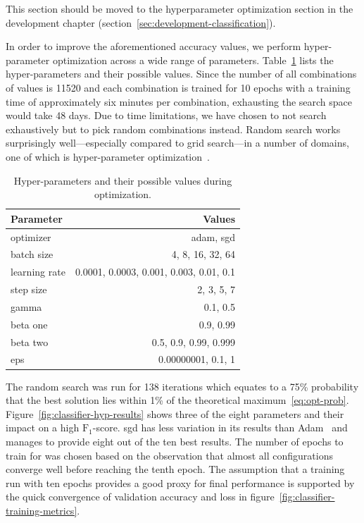 \documentclass[draft,final]{vutinfth} %
\begin{document}
This section should be moved to the hyperparameter optimization
section in the development chapter
(section~\ref{sec:development-classification}).

In order to improve the aforementioned accuracy values, we perform
hyper-parameter optimization across a wide range of
parameters. Table~\ref{tab:classifier-hyps} lists the hyper-parameters
and their possible values. Since the number of all combinations of
values is 11520 and each combination is trained for 10 epochs with a
training time of approximately six minutes per combination, exhausting
the search space would take 48 days. Due to time limitations, we have
chosen to not search exhaustively but to pick random combinations
instead. Random search works surprisingly well---especially compared to
grid search---in a number of domains, one of which is hyper-parameter
optimization~\cite{bergstra2012}.

\begin{table}[h]
  \centering
  \begin{tabular}{lr}
    \toprule
    Parameter &  Values \\
    \midrule
    optimizer &	adam, sgd \\
    batch size & 4, 8, 16, 32, 64 \\
    learning rate & 0.0001, 0.0003, 0.001, 0.003, 0.01, 0.1 \\
    step size & 2, 3, 5, 7 \\
    gamma & 0.1, 0.5 \\
    beta one & 0.9, 0.99 \\
    beta two & 0.5, 0.9, 0.99, 0.999 \\
    eps & 0.00000001, 0.1, 1 \\
    \bottomrule
  \end{tabular}
  \caption{Hyper-parameters and their possible values during
    optimization.}
  \label{tab:classifier-hyps}
\end{table}

The random search was run for 138 iterations which equates to a 75\%
probability that the best solution lies within 1\% of the theoretical
maximum~\eqref{eq:opt-prob}. Figure~\ref{fig:classifier-hyp-results}
shows three of the eight parameters and their impact on a high
$\mathrm{F}_1$-score. \gls{sgd} has less variation in its results than
Adam~\cite{kingma2017} and manages to provide eight out of the ten
best results. The number of epochs to train for was chosen based on
the observation that almost all configurations converge well before
reaching the tenth epoch. The assumption that a training run with ten
epochs provides a good proxy for final performance is supported by the
quick convergence of validation accuracy and loss in
figure~\ref{fig:classifier-training-metrics}.
\end{document}
